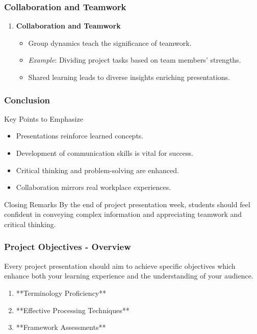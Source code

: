 \documentclass[aspectratio=169]{beamer}
\begin{document}
\begin{frame}[fragile]
    \frametitle{Collaboration and Teamwork}
    \begin{enumerate}
        \item \textbf{Collaboration and Teamwork}
            \begin{itemize}
                \item Group dynamics teach the significance of teamwork.
                \item \textit{Example}: Dividing project tasks based on team members' strengths.
                \item Shared learning leads to diverse insights enriching presentations.
            \end{itemize}
    \end{enumerate}
\end{frame}

\begin{frame}[fragile]
    \frametitle{Conclusion}
    \begin{block}{Key Points to Emphasize}
        \begin{itemize}
            \item Presentations reinforce learned concepts.
            \item Development of communication skills is vital for success.
            \item Critical thinking and problem-solving are enhanced.
            \item Collaboration mirrors real workplace experiences.
        \end{itemize}
    \end{block}
    \begin{block}{Closing Remarks}
        By the end of project presentation week, students should feel confident in conveying complex information and appreciating teamwork and critical thinking.
    \end{block}
\end{frame}

\begin{frame}[fragile]
    \frametitle{Project Objectives - Overview}
    Every project presentation should aim to achieve specific objectives which enhance both your learning experience and the understanding of your audience.
    
    \begin{enumerate}
        \item **Terminology Proficiency**
        \item **Effective Processing Techniques**
        \item **Framework Assessments**
    \end{enumerate}
\end{frame}
\end{document}
